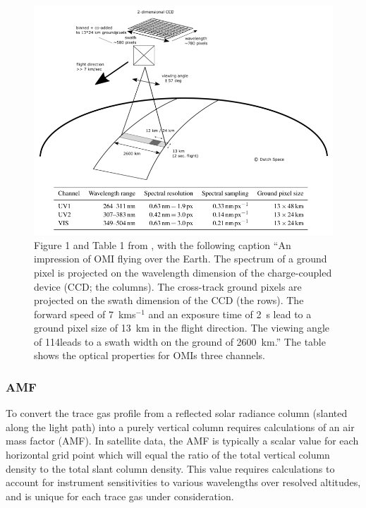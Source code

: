       \begin{figure}
        \includegraphics[width=\textwidth]{Figures/Shenkeveld_OMI_summary.png}
        \caption{ %
          Figure 1 and Table 1 from \cite{Schenkeveld2017}, with the following caption ``An impression of OMI flying over the Earth.
          The spectrum of a ground pixel is projected on the wavelength dimension of the charge-coupled device (CCD; the columns). 
          The cross-track ground pixels are projected on the swath dimension of the CCD (the rows).
          The forward speed of 7~kms$^{-1}$ and an exposure time of 2~s lead to a ground pixel size of 13~km in the flight direction.
          The viewing angle of 114\degr leads to a swath width on the ground of 2600~km.''
          The table shows the optical properties for OMIs three channels.}
      \label{LR:HCHO:Sat:fig_Shenkeveld_OMI_summary}
      \end{figure}
        
    \subsubsection{AMF}
      To convert the trace gas profile from a reflected solar radiance column (slanted along the light path) into a purely vertical column requires calculations of an air mass factor (AMF).
      In satellite data, the AMF is typically a scalar value for each horizontal grid point which will equal the ratio of the total vertical column density to the total slant column density.
      This value requires calculations to account for instrument sensitivities to various wavelengths over resolved altitudes, and is unique for each trace gas under consideration.
      
